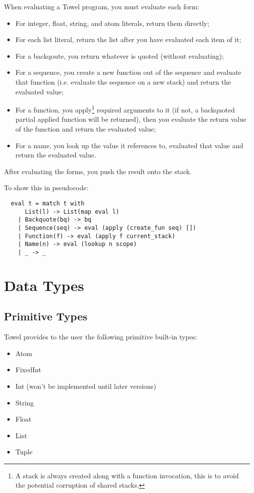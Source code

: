 \documentclass{book}
\begin{document}
When evaluating a Towel program, you must evaluate each form:
\begin{itemize}
\item For integer, float, string, and atom literals, return them directly;
\item For each list literal, return the list after you have evaluated each item of it;
\item For a backqoute, you return whatever is quoted (without evaluating);
\item For a sequence, you create a new function out of the sequence and evaluate that function (i.e. evaluate the sequence on a new stack) and return the evaluated value;
\item For a function, you apply\footnote{A stack is always created along with a function invocation, this is to avoid the potential corruption of shared stacks.} required arguments to it (if not, a backquoted partial applied function will be returned), then you evaluate the return value of the function and return the evaluated value;
\item For a name, you look up the value it references to, evaluated that value and return the evaluated value.
\end{itemize}

After evaluating the forms, you push the result onto the stack.

To show this in pseudocode:
\begin{verbatim}
  eval t = match t with
      List(l) -> List(map eval l)
    | Backquote(bq) -> bq
    | Sequence(seq) -> eval (apply (create_fun seq) [])
    | Function(f) -> eval (apply f current_stack)
    | Name(n) -> eval (lookup n scope)
    | _ -> _
\end{verbatim}

\chapter{Data Types}
\label{chap:data-types}

\section{Primitive Types}
Towel provides to the user the following primitive built-in types:
\begin{itemize}
\item Atom
\item FixedInt
\item Int (won't be implemented until later versions)
\item String
\item Float
\item List
\item Tuple
\end{itemize}
\end{document}
